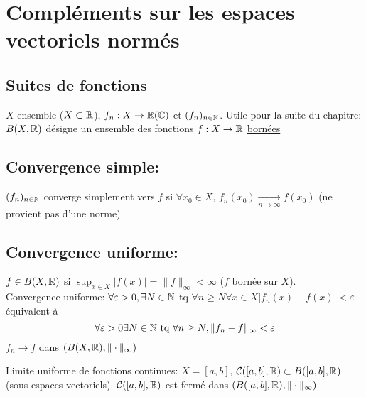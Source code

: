 \section{Compléments sur les espaces vectoriels normés}
\subsection{Suites de fonctions}
$X$ ensemble ($X \subset \mathbb{R}$), $f_n: X \to \mathbb{R}(\mathbb{C})$ et $(f_n)_{n \in \mathbb{N}}$. Utile pour la suite du chapitre: $B(X, \mathbb{R})$ désigne un ensemble des fonctions $f: X \to \mathbb{R}$ \underline{bornées}
\subsection{Convergence simple: }
\begin{definition}
    $(f_n)_{n \in \mathbb{N}}$ converge simplement vers $f$ si  $\forall x_0 \in X$, $f_n(x_0) \xrightarrow[n \to \infty]{} f(x_0)$ (ne provient pas d'une norme).
\end{definition}
\subsection{Convergence uniforme: }
\begin{definition}
    $f \in B(X, \mathbb{R})$ si $\sup_{x \in X} |f(x)| = \|f\|_{\infty} < \infty$ ($f$ bornée sur  $X$). \\
    Convergence uniforme: $\forall \varepsilon > 0, \exists N \in \mathbb{N}$ tq $\forall n \ge N \forall x \in X |f_n(x) - f(x)| < \varepsilon$ équivalent à
    \[
    \forall \varepsilon > 0 \exists N \in \mathbb{N} \text{ tq } \forall n \ge N, \|f_n - f\|_{\infty} < \varepsilon
    \] 
    $f_n \to f$ dans $(B(X, \mathbb{R}), \| \cdot \|_{\infty})$
\end{definition}
\begin{definition}
    Limite uniforme de fonctions continues: $X = [a, b]$,  $\mathcal{C}([a, b], \mathbb{R}) \subset B([a, b], \mathbb{R})$(sous espaces vectoriels). $\mathcal{C}([a, b], \mathbb{R})$ est fermé dans $(B([a, b], \mathbb{R}), \| \cdot \|_{\infty})$
\end{definition}
